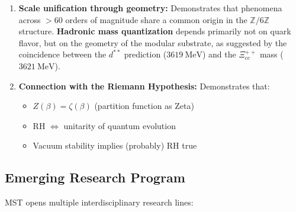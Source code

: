 \documentclass[11pt, a4paper]{article}
\theoremstyle{plain}
\theoremstyle{definition}
\begin{document}
\begin{enumerate}
    \item \textbf{Scale unification through geometry:} Demonstrates that phenomena across $>60$ orders of magnitude share a common origin in the $\mathbb{Z}/6\mathbb{Z}$ structure. \textbf{Hadronic mass quantization} depends primarily not on quark flavor, but on the geometry of the modular substrate, as suggested by the coincidence between the $d^{**}$ prediction ($3619\ \si{\mega\electronvolt}$) and the $\Xi_{cc}^{++}$ mass ($3621\ \si{\mega\electronvolt}$).
    
    \item \textbf{Connection with the Riemann Hypothesis:} Demonstrates that:
    \begin{itemize}
        \item $Z(\beta) = \zeta(\beta)$ (partition function as Zeta)
        \item RH $\Leftrightarrow$ unitarity of quantum evolution
        \item Vacuum stability implies (probably) RH true
    \end{itemize}
\end{enumerate}

\subsection{Emerging Research Program}

MST opens multiple interdisciplinary research lines:
\end{document}
